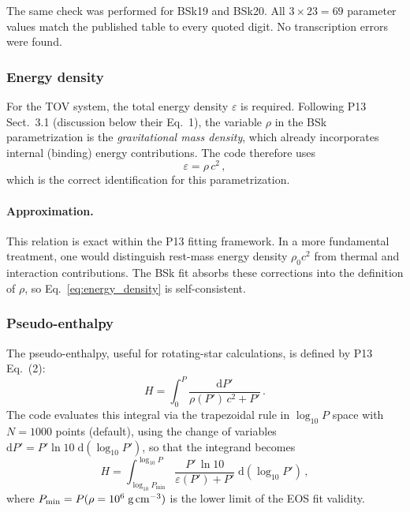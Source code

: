 The same check was performed for BSk19 and BSk20.
All $3\times23=69$ parameter values match the published table to every
quoted digit.  No transcription errors were found.

\subsubsection{Energy density}

For the TOV system, the total energy density $\varepsilon$ is required.
Following P13 Sect.~3.1 (discussion below their Eq.~1), the variable $\rho$
in the BSk parametrization is the \emph{gravitational mass density}, which
already incorporates internal (binding) energy contributions.  The
code therefore uses
\begin{equation}
  \varepsilon = \rho\,c^{2}\,,
  \label{eq:energy_density}
\end{equation}
which is the correct identification for this parametrization.

\paragraph{Approximation.}
This relation is exact within the P13 fitting framework.
In a more fundamental treatment, one would distinguish rest-mass energy
density $\rho_0 c^{2}$ from thermal and interaction contributions.
The BSk fit absorbs these corrections into the definition of $\rho$, so
Eq.~\eqref{eq:energy_density} is self-consistent.

\subsubsection{Pseudo-enthalpy}
\label{sec:pseudo_enthalpy}

The pseudo-enthalpy, useful for rotating-star calculations, is defined by
P13 Eq.~(2):
\begin{equation}
  H = \int_{0}^{P}\frac{\mathrm{d}P'}{\rho(P')\,c^{2}+P'}\,.
  \label{eq:pseudo_enthalpy}
\end{equation}
The code evaluates this integral via the trapezoidal rule in $\log_{10}P$
space with $N=1000$ points (default), using the change of variables
$\mathrm{d}P' = P'\ln10\;\mathrm{d}(\log_{10}P')$, so that the integrand
becomes
\begin{equation}
  H = \int_{\log_{10}P_{\min}}^{\log_{10}P}
      \frac{P'\,\ln 10}{\varepsilon(P') + P'}\;\mathrm{d}(\log_{10}P')\,,
  \label{eq:pseudo_enthalpy_logP}
\end{equation}
where $P_{\min}=P(\rho=10^{6}\;\text{g\,cm}^{-3})$ is the lower limit of
the EOS fit validity.

